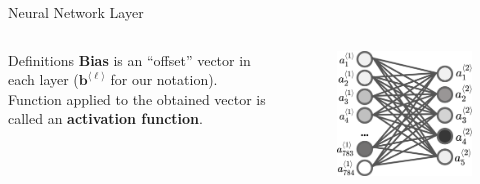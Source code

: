 \documentclass{beamer}
\begin{document}
    \begin{frame}{Neural Network Layer}
        \begin{columns}
        \begin{column}{0.7\textwidth}

        \begin{block}{Definitions}
            \textbf{Bias} is an ``offset'' vector in each layer ($\mathbf{b}^{\langle\ell\rangle}$ for our notation). Function applied to the obtained vector is called an \textbf{activation function}.
        \end{block} 
        \end{column}

        \begin{column}{0.3\textwidth}
        \begin{figure}
        \centering
            \includegraphics[width=\textwidth]{images/presentation/layer_all_all.png}
        \end{figure}
        \end{column}
        \end{columns}
    \end{frame}
\end{document}

